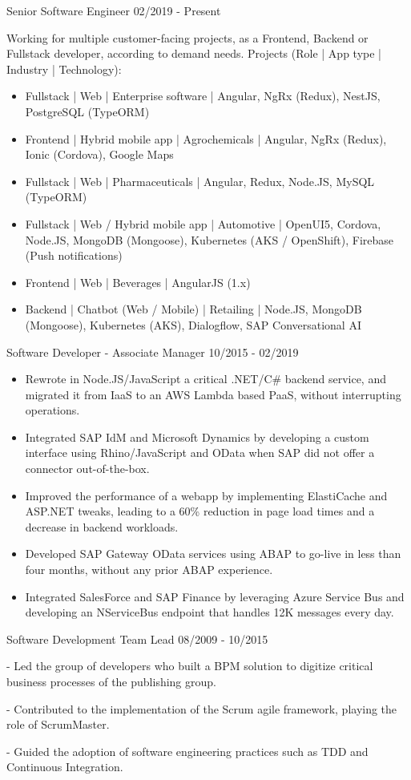 \documentclass[11pt]{article} %
\begin{document}
\begin{description}
\squish
{}
           {Senior Software Engineer}
           {02/2019 - Present}

Working for multiple customer-facing projects, as a Frontend, Backend or Fullstack developer, according to demand needs.
\vskip 0.1in
Projects (Role | App type | Industry | Technology):
\begin{itemize}
\item Fullstack | Web | Enterprise software | Angular, NgRx (Redux), NestJS, PostgreSQL (TypeORM)
\item Frontend | Hybrid mobile app | Agrochemicals | Angular, NgRx (Redux), Ionic (Cordova), Google Maps
\item Fullstack | Web | Pharmaceuticals | Angular, Redux, Node.JS, MySQL (TypeORM)
\item Fullstack | Web / Hybrid mobile app | Automotive | OpenUI5, Cordova, Node.JS, MongoDB (Mongoose), Kubernetes (AKS / OpenShift), Firebase (Push notifications)
\item Frontend | Web | Beverages | AngularJS (1.x)
\item Backend | Chatbot (Web / Mobile) | Retailing | Node.JS, MongoDB (Mongoose), Kubernetes (AKS), Dialogflow, SAP Conversational AI
\end{itemize}

           {Software Developer - Associate Manager}
           {10/2015 - 02/2019}

\begin{itemize}
\item Rewrote in Node.JS/JavaScript a critical .NET/C\# backend service, and migrated it from IaaS to an AWS Lambda based PaaS, without interrupting operations.
\item Integrated SAP IdM and Microsoft Dynamics by developing a custom interface using Rhino/JavaScript and OData when SAP did not offer a connector out-of-the-box.
\item Improved the performance of a webapp by implementing ElastiCache and ASP.NET tweaks, leading to a 60\% reduction in page load times and a decrease in backend workloads.
\item Developed SAP Gateway OData services using ABAP to go-live in less than four months, without any prior ABAP experience.
\item Integrated SalesForce and SAP Finance by leveraging Azure Service Bus and developing an NServiceBus endpoint that handles 12K messages every day.
\end{itemize}

           {Software Development Team Lead}
           {08/2009 - 10/2015}

- Led the group of developers who built a BPM solution to digitize critical business processes of the publishing group.

- Contributed to the implementation of the Scrum agile framework, playing the role of ScrumMaster.

- Guided the adoption of software engineering practices such as TDD and Continuous Integration.

\end{description}
\end{document}
